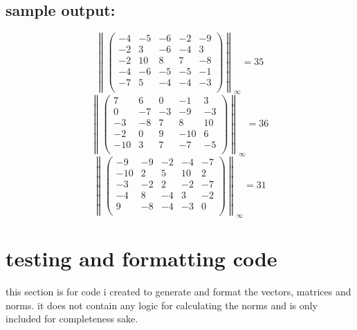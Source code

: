 \documentclass{article}
\begin{document}
	\subsection*{sample output:}
	$$ \left\| \begin{pmatrix}-4 & -5 & -6 & -2 & -9 \\-2 & 3 & -6 & -4 & 3 \\-2 & 10 & 8 & 7 & -8 \\-4 & -6 & -5 & -5 & -1 \\-7 & 5 & -4 & -4 & -3 \\\end{pmatrix}\right\|_{\infty} = 35$$
	$$ \left\| \begin{pmatrix}7 & 6 & 0 & -1 & 3 \\0 & -7 & -3 & -9 & -3 \\-3 & -8 & 7 & 8 & 10 \\-2 & 0 & 9 & -10 & 6 \\-10 & 3 & 7 & -7 & -5 \\\end{pmatrix}\right\|_{\infty} = 36$$
	$$ \left\| \begin{pmatrix}-9 & -9 & -2 & -4 & -7 \\-10 & 2 & 5 & 10 & 2 \\-3 & -2 & 2 & -2 & -7 \\-4 & 8 & -4 & 3 & -2 \\9 & -8 & -4 & -3 & 0 \\\end{pmatrix}\right\|_{\infty} = 31$$
\pagebreak
\section{testing and formatting code}
	this section is for code i created to generate and format the vectors, matrices and norms.
	it does not contain any logic for calculating the norms and is only included for completeness sake.
	
\end{document}
